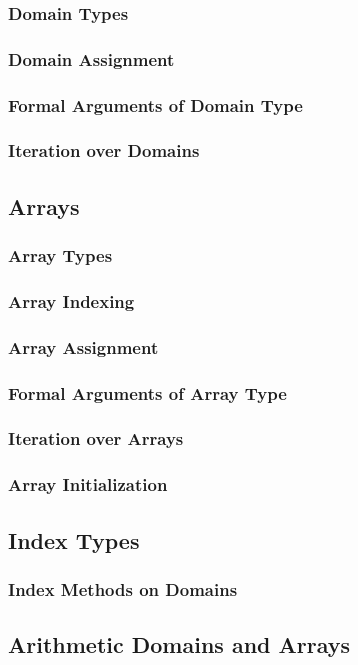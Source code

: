\documentclass[10pt,twoside,titlepage]{article}
\begin{document}
\subsubsection{Domain Types}
\subsubsection{Domain Assignment}
\subsubsection{Formal Arguments of Domain Type}
\subsubsection{Iteration over Domains}
\subsection{Arrays}
\subsubsection{Array Types}
\subsubsection{Array Indexing}
\subsubsection{Array Assignment}
\subsubsection{Formal Arguments of Array Type}
\subsubsection{Iteration over Arrays}
\subsubsection{Array Initialization}
\subsection{Index Types}
\subsubsection{Index Methods on Domains}
\subsection{Arithmetic Domains and Arrays}
\end{document}
